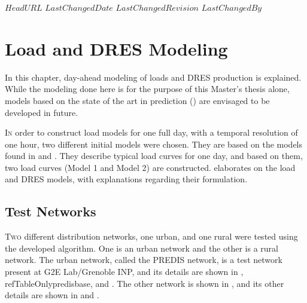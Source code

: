 \svnidlong
{$HeadURL$}
{$LastChangedDate$}
{$LastChangedRevision$}
{$LastChangedBy$}

\chapter{Load and DRES Modeling}

\begin{introduction}
  In this chapter, day-ahead modeling of loads and DRES production is explained. While the modeling done here is for the purpose of this Master's thesis alone, models based on the state of the art in prediction () are envisaged to be developed in future.
\end{introduction}

\lettrine[nindent=0pt]{I}{n} order to construct load models for one full day, with a temporal resolution of one hour, two different initial models were chosen. They are based on the models found in \cite{Lopez2004} and \cite{Yin2009}. They describe typical load curves for one day, and based on them, two load curves (Model 1 and Model 2) are constructed. elaborates on the load and DRES models, with explanations regarding their formulation.

\section{Test Networks}

\lettrine[nindent=0pt]{T}{wo} different distribution networks, one urban, and one rural were tested using the developed algorithm. One is an urban network and the other is a rural network. The urban network, called the PREDIS network, is a test network present at G2E Lab/Grenoble INP, and its details are shown in , refTableOnly{predisbase}, and . The other network is shown in , and its other details are shown in  and .\\

